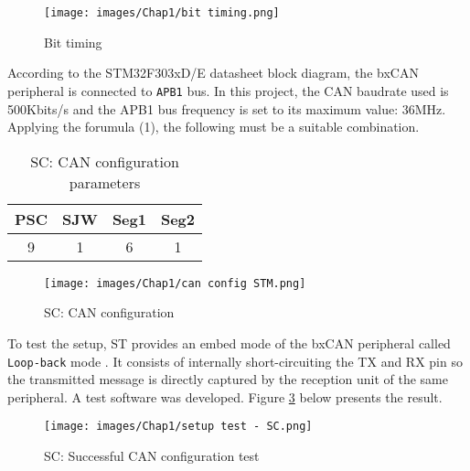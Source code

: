 \begin{figure}[H]
\begin{center}
\texttt{[image: images/Chap1/bit timing.png]}\\
\caption{Bit timing \cite{R5}}
\label{bit timing CAN STM32}
\end{center}
\end{figure}

According to the STM32F303xD/E datasheet block diagram, the bxCAN peripheral is connected to \texttt{APB1} bus.
In this project, the CAN baudrate used is 500Kbits/s and the APB1 bus frequency is set to its maximum value: 36MHz.
Applying the forumula (1), the following must be a suitable combination.

\begin{table} [H]
\centering
\begin{tabular}{| c | c | c | c |} 
 \hline
 PSC & SJW & Seg1 & Seg2 \\ [0.5ex] %
 \hline\hline
 9 &  1 & 6 &1       \\ 
 \hline
\end{tabular}
\caption{SC: CAN configuration parameters}
\label{SC config params}
\end{table}

\begin{figure}[H]
\begin{center}
\texttt{[image: images/Chap1/can config STM.png]}\\
\caption{SC: CAN configuration}
\label{config CAN STM32}
\end{center}
\end{figure}

To test the setup, ST provides an embed mode of the bxCAN peripheral called \texttt{Loop-back} mode \cite{R23}. It consists of internally short-circuiting the TX and RX pin so the transmitted message is directly captured by the reception unit of the same peripheral. A test software was developed. Figure \ref{rx-tx test on STM32} below presents the result.

\begin{figure}[H]
\begin{center}
\texttt{[image: images/Chap1/setup test - SC.png]}\\
\caption{SC: Successful CAN configuration test}
\label{rx-tx test on STM32}
\end{center}
\end{figure}

